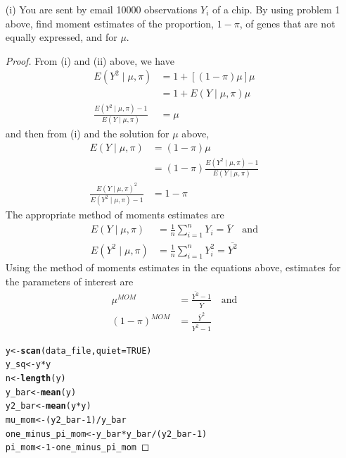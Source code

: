 \documentclass[letterpaper, 12pt]{article}\usepackage[]{graphicx}\usepackage[]{color}
\makeatletter
\newcommand{\hlnum}[1]{\textcolor[rgb]{0.686,0.059,0.569}{#1}}%
\newcommand{\hlopt}[1]{\textcolor[rgb]{0,0,0}{#1}}%
\newcommand{\hlstd}[1]{\textcolor[rgb]{0.345,0.345,0.345}{#1}}%
\newcommand{\hlkwb}[1]{\textcolor[rgb]{0.69,0.353,0.396}{#1}}%
\newcommand{\hlkwc}[1]{\textcolor[rgb]{0.333,0.667,0.333}{#1}}%
\newcommand{\hlkwd}[1]{\textcolor[rgb]{0.737,0.353,0.396}{\textbf{#1}}}%
\newenvironment{kframe}{%
 \def\at@end@of@kframe{}%
 \ifinner\ifhmode%
  \def\at@end@of@kframe{\end{minipage}}%
  \begin{minipage}{\columnwidth}%
 \fi\fi%
 \def\FrameCommand##1{\hskip\@totalleftmargin \hskip-\fboxsep
 \colorbox{shadecolor}{##1}\hskip-\fboxsep
     \hskip-\linewidth \hskip-\@totalleftmargin \hskip\columnwidth}%
 \MakeFramed {\advance\hsize-\width
   \@totalleftmargin\z@ \linewidth\hsize
   \@setminipage}}%
 {\par\unskip\endMakeFramed%
 \at@end@of@kframe}
\newenvironment{knitrout}{}{} %
\newcommand{\sbs}{\;|\;} %
\newcommand{\sion}{\sum_{i=1}^n}
\makeatother
\begin{document}
\begin{enumerate}
\begin{enumerate}
\item[(i)]
You are sent by email 10000 observations $Y_i$ of a chip.
By using problem 1 above, find moment estimates of the proportion, $1-\pi$, of genes that are not equally expressed, and for $\mu$.
\begin{proof}
From (i) and (ii) above, we have 
\begin{align*}
E(Y^2 \sbs \mu, \pi) &= 1+ [(1 - \pi)\mu]\mu
\\
&= 1 + E(Y \sbs \mu, \pi)\mu \\
\frac{E(Y^2 \sbs \mu, \pi) - 1}{E(Y \sbs \mu, \pi)} &= \mu
\end{align*}
and then from (i) and the solution for $\mu$ above, 
\begin{align*}
E(Y \sbs \mu, \pi) &= (1-\pi)\mu
\\
&= (1 - \pi) 
\frac{E(Y^2 \sbs \mu, \pi) - 1}{E(Y \sbs \mu, \pi)} \\
\frac{E(Y \sbs \mu, \pi)^2}{E(Y^2 \sbs \mu, \pi) - 1} 
&= 1- \pi
\end{align*}
The appropriate method of moments estimates are
\begin{align*}
E(Y \mid \mu, \pi) &= \frac{1}{n}\sion Y_i = \overline{Y}
\quad
\text{and}
\\
E(Y^2 \mid \mu, \pi) &= \frac{1}{n} \sion Y_i^2 = \overline{Y^2}
\end{align*}
Using the method of moments estimates in the equations above, estimates for the parameters of interest are
\begin{align*}
\mu^{MOM} &= \frac{\overline{Y^2} - 1}{\overline{Y}}
\quad
\text{and}
\\
(1-\pi)^{MOM} &= \frac{\overline{Y}^2}{\overline{Y^2}-1}
\end{align*}


\begin{knitrout}
\color{fgcolor}\begin{kframe}
\begin{alltt}
\hlstd{y} \hlkwb{<-} \hlkwd{scan}\hlstd{(data_file,} \hlkwc{quiet} \hlstd{=} \hlnum{TRUE}\hlstd{)}
\hlstd{y_sq} \hlkwb{<-} \hlstd{y} \hlopt{*} \hlstd{y}
\hlstd{n} \hlkwb{<-} \hlkwd{length}\hlstd{(y)}
\hlstd{y_bar} \hlkwb{<-} \hlkwd{mean}\hlstd{(y)}
\hlstd{y2_bar} \hlkwb{<-} \hlkwd{mean}\hlstd{(y} \hlopt{*} \hlstd{y)}
\hlstd{mu_mom} \hlkwb{<-} \hlstd{(y2_bar} \hlopt{-} \hlnum{1}\hlstd{)}\hlopt{/}\hlstd{y_bar}
\hlstd{one_minus_pi_mom} \hlkwb{<-} \hlstd{y_bar} \hlopt{*} \hlstd{y_bar}\hlopt{/}\hlstd{(y2_bar} \hlopt{-} \hlnum{1}\hlstd{)}
\hlstd{pi_mom} \hlkwb{<-} \hlnum{1} \hlopt{-} \hlstd{one_minus_pi_mom}


\end{alltt}
\end{kframe}
\end{knitrout}
\end{proof}
\end{enumerate}
\end{enumerate}
\end{document}
